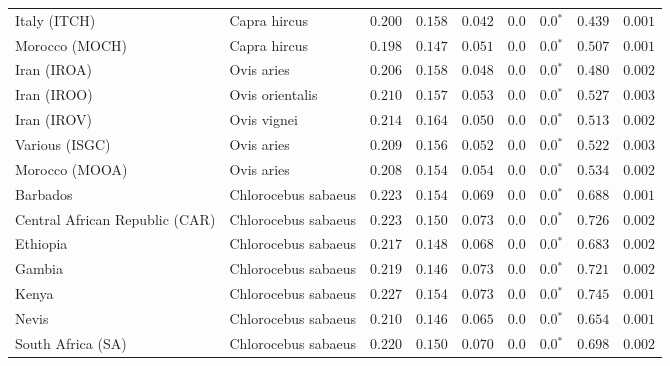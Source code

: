 \begin{center}
\begin{adjustbox}{width = 1\textwidth}
\begin{tabular}{|l|l|r|r|r|r|r|r|r|}
            Italy (ITCH)                    & Capra hircus          & $ 0.200$ & $ 0.158$ & $ 0.042$ & $0.0$ & $\bm{0.0{^*}}$ & $ 0.439$ & $ 0.001$  \\
            Morocco (MOCH)                    & Capra hircus     & $ 0.198$ & $ 0.147$ & $ 0.051$ & $0.0$ & $\bm{0.0{^*}}$ & $ 0.507$ & $ 0.001$ \\
            Iran (IROA)                    & Ovis aries         & $ 0.206$ & $ 0.158$ & $ 0.048$ & $0.0$ & $\bm{0.0{^*}}$ & $ 0.480$ & $ 0.002$ \\
            Iran (IROO)                 & Ovis orientalis          & $ 0.210$ & $ 0.157$ & $ 0.053$ & $0.0$ & $\bm{0.0{^*}}$ & $ 0.527$ & $ 0.003$ \\
            Iran (IROV)                 & Ovis vignei          & $ 0.214$ & $ 0.164$ & $ 0.050$ & $0.0$ & $\bm{0.0{^*}}$ & $ 0.513$ & $ 0.002$ \\
            Various (ISGC)                       & Ovis aries & $ 0.209$ & $ 0.156$ & $ 0.052$ & $0.0$ & $\bm{0.0{^*}}$ & $ 0.522$ & $ 0.003$ \\
            Morocco (MOOA) & Ovis aries & $ 0.208$ & $ 0.154$ & $ 0.054$ & $0.0$ & $\bm{0.0{^*}}$ & $ 0.534$ & $ 0.002$ \\
            Barbados                       & Chlorocebus sabaeus & $ 0.223$ & $ 0.154$ & $ 0.069$ & $0.0$ & $\bm{0.0{^*}}$ & $ 0.688$ & $ 0.001$ \\
            Central African Republic (CAR)                         & Chlorocebus sabaeus & $ 0.223$ & $ 0.150$ & $ 0.073$ & $0.0$ & $\bm{0.0{^*}}$ & $ 0.726$ & $ 0.002$ \\
            Ethiopia                          & Chlorocebus sabaeus & $ 0.217$ & $ 0.148$ & $ 0.068$ & $0.0$ & $\bm{0.0{^*}}$ & $ 0.683$ & $ 0.002$ \\
            Gambia                          & Chlorocebus sabaeus & $ 0.219$ & $ 0.146$ & $ 0.073$ & $0.0$ & $\bm{0.0{^*}}$ & $ 0.721$ & $ 0.002$ \\
            Kenya              & Chlorocebus sabaeus & $ 0.227$ & $ 0.154$ & $ 0.073$ & $0.0$ & $\bm{0.0{^*}}$ & $ 0.745$ & $ 0.001$ \\
            Nevis               & Chlorocebus sabaeus & $ 0.210$ & $ 0.146$ & $ 0.065$ & $0.0$ & $\bm{0.0{^*}}$ & $ 0.654$ & $ 0.001$ \\
            South Africa (SA)                         & Chlorocebus sabaeus & $ 0.220$ & $ 0.150$ & $ 0.070$ & $0.0$ & $\bm{0.0{^*}}$ & $ 0.698$ & $ 0.002$ \\

\end{tabular}
\end{adjustbox}
\end{center}
